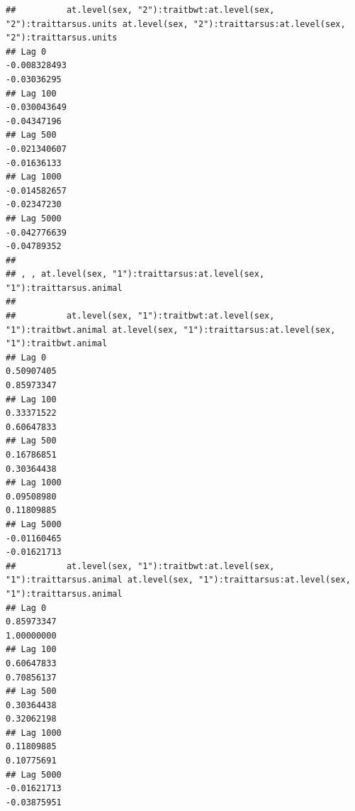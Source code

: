 \documentclass[
  12pt,
]{book}
\begin{document}
\begin{verbatim}
##          at.level(sex, "2"):traitbwt:at.level(sex, "2"):traittarsus.units at.level(sex, "2"):traittarsus:at.level(sex, "2"):traittarsus.units
## Lag 0                                                        -0.008328493                                                         -0.03036295
## Lag 100                                                      -0.030043649                                                         -0.04347196
## Lag 500                                                      -0.021340607                                                         -0.01636133
## Lag 1000                                                     -0.014582657                                                         -0.02347230
## Lag 5000                                                     -0.042776639                                                         -0.04789352
## 
## , , at.level(sex, "1"):traittarsus:at.level(sex, "1"):traittarsus.animal
## 
##          at.level(sex, "1"):traitbwt:at.level(sex, "1"):traitbwt.animal at.level(sex, "1"):traittarsus:at.level(sex, "1"):traitbwt.animal
## Lag 0                                                        0.50907405                                                        0.85973347
## Lag 100                                                      0.33371522                                                        0.60647833
## Lag 500                                                      0.16786851                                                        0.30364438
## Lag 1000                                                     0.09508980                                                        0.11809885
## Lag 5000                                                    -0.01160465                                                       -0.01621713
##          at.level(sex, "1"):traitbwt:at.level(sex, "1"):traittarsus.animal at.level(sex, "1"):traittarsus:at.level(sex, "1"):traittarsus.animal
## Lag 0                                                           0.85973347                                                           1.00000000
## Lag 100                                                         0.60647833                                                           0.70856137
## Lag 500                                                         0.30364438                                                           0.32062198
## Lag 1000                                                        0.11809885                                                           0.10775691
## Lag 5000                                                       -0.01621713                                                          -0.03875951

\end{verbatim}
\end{document}
